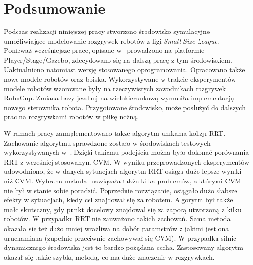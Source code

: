 \chapter[Podsumowanie]{Podsumowanie}
Podczas realizacji niniejszej pracy stworzono środowisko symulacyjne umożliwiające modelowanie rozgrywek robotów z ligi \emph{Small-Size League}. Ponieważ wcześniejsze prace, opisane w~\cite{inzynierka}
prowadzono na platformie Player/Stage/Gazebo, zdecydowano się na dalszą pracę z tym środowiskiem. Uaktualniono natomiast wersję stosowanego oprogramowania. Opracowano także nowe modele robotów
oraz boiska. Wykorzystywane w trakcie eksperymentów modele robotów wzorowane były na rzeczywistych zawodnikach rozgrywek RoboCup. Zmiana bazy jezdnej na wielokierunkową wymusiła implementację nowego sterownika
robota. Przygotowane środowisko, może posłużyć do dalszych prac na rozgrywkami robotów w piłkę nożną.

W ramach pracy zaimplementowano także algorytm unikania kolizji RRT. Zachowanie algorytmu sprawdzone zostało w środowiskach testowych wykorzystywanych w~\cite{inzynierka}. Dzięki takiemu podejściu
można było dokonać porównania RRT z wcześniej stosowanym CVM. W wyniku przeprowadzonych eksperymentów udowodniono, że w danych sytuacjach algorytm RRT osiąga dużo lepsze wyniki niż CVM.
Wybrana metoda rozwiązała także kilka problemów, z którymi CVM nie był w stanie sobie poradzić. Poprzednie rozwiązanie, osiągało dużo słabsze efekty w sytuacjach, kiedy cel znajdował się za robotem.
Algorytm był także mało skuteczny, gdy punkt docelowy znajdował się za zaporą utworzoną z kilku robotów. W przypadku RRT nie zauważono takich zachowań.
Sama metoda okazała się też dużo mniej wrażliwa na dobór parametrów z jakimi jest ona uruchamiana (zupełnie przeciwnie zachowywał się CVM). W przypadku silnie dynamicznego środowiska
jest to bardzo pożądana cecha. Zastosowany algorytm okazał się także szybką metodą, co ma duże znaczenie w rozgrywkach.

